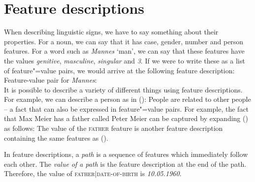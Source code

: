 \section{Feature descriptions}

When describing linguistic signs, we have to say something about their properties. For a noun, we can say that it has case, gender, number and person features.
For a word such as  \emph{Mannes} `man', we can say that these features have the values \emph{genitive}, \emph{masculine}, \emph{singular} and \emph{3}.
If we were to write these as a list of feature"=value pairs, we would arrive at the following feature description:
\eas
Feature-value pair for \emph{Mannes}:\\
\zs
It is possible to describe a variety of different things using feature descriptions. For example, we can describe a person as in ():
\ea
{}
\z
People are related to other people -- a fact that can also be expressed in feature"=value pairs. For example, the fact that Max Meier has a father
called Peter Meier can be captured by expanding () as follows: 
\ea
{}
\z
The value of the \textsc{father} feature is another feature description containing the same features as ().

In feature descriptions, a \emph{path} is a sequence of features which immediately follow each other.
The \emph{value of a path} is the feature description at the end of the path. Therefore,
the value of \textsc{father$|$date-of-birth} is \emph{10.05.1960}.

